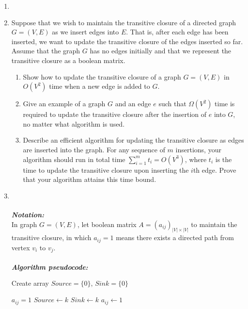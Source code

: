 \documentclass[12pt,a4paper]{article}
\makeatletter
\newtheorem*{solution}{Solution}
\theoremstyle{definition}
\renewenvironment{solution}[1][Solution] {\par\pushQED{\qed}\normalfont\topsep6\p@\@plus6\p@\relax\trivlist\item[\hskip\labelsep\bfseries#1\@addpunct{.}]\ignorespaces}{\popQED\endtrivlist\@endpefalse} \makeatother
\makeatother
\begin{document}
\begin{enumerate}
\begin{solution}
	\end{solution}
	\item Suppose that we wish to maintain the transitive closure of a directed graph $G=(V,E)$ as we insert edges into $E$. That is, after each edge has been inserted, we want to update the transitive closure of the edges inserted so far. Assume that the graph $G$ has no edges initially and that we represent the transitive closure as a boolean matrix.
	\begin{enumerate}
	    \item Show how to update the transitive closure of a graph $G=(V,E)$ in $O(V^2)$ time when a new edge is added to $G$.
	    \item Give an example of a graph $G$ and an edge $e$ such that $\Omega(V^2)$ time is required to update the transitive closure after the insertion of $e$ into $G$, no matter what algorithm is used.
	    \item Describe an efficient algorithm for updating the transitive closure as edges are inserted into the graph. For any sequence of $m$ insertions, your algorithm should run in total time $\sum_{i=1}^m t_i=O(V^3)$, where $t_i$ is the time to update the transitive closure upon inserting the $i$th edge. Prove that your algorithm attains this time bound.
	\end{enumerate}
	\begin{solution}
	~\\
	~\\
	    \textbf{\textit{Notation:}}
	    \\
	    In graph $G=(V,E)$, let boolean matrix $A=(a_{ij})_{|V|\times |V|}$ to maintain the transitive closure, in which $a_{ij}=1$ means there exists a directed path from vertex $v_i$ to $v_j$.
	    \\
	    \\
	    \textbf{\textit{Algorithm pseudocode:}}
	    \\
	    \begin{algorithm}[H]
	        \caption{$INSERT(v_i,v_j,A)$}\label{Alg-INSERT}
	
	        \BlankLine
	        
	        Create array $Source=\{0\}$, $Sink=\{0\}$\;
	        
	        $a_{ij}=1$\;
	        {
	            {
	                $Source\leftarrow k$\;
	            }
	            \Else
	            {
	                $Sink\leftarrow k$\;
	            }
	        }
	        {
	            {
	                $a_{ij}\leftarrow 1$\;
	            }
	        }
	    \end{algorithm}
	   

\end{solution}
\end{enumerate}
\end{document}
